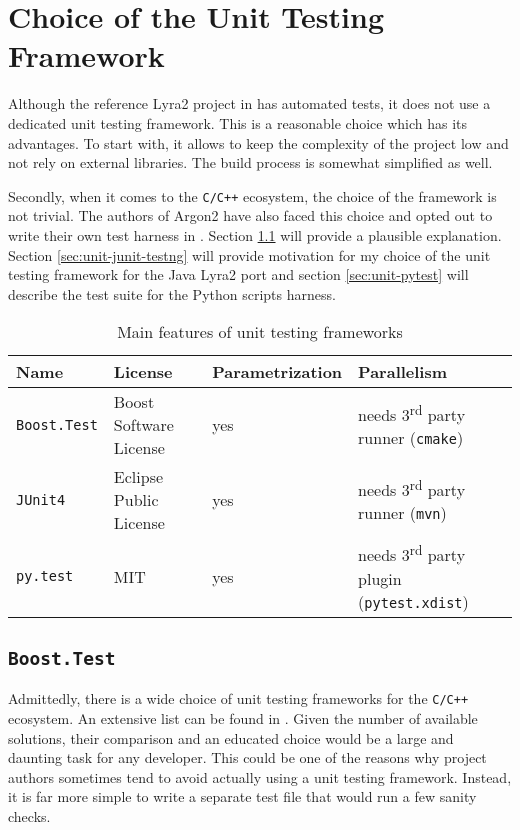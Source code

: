 \section{Choice of the Unit Testing Framework}

Although the reference Lyra2 project in \cite{github:2017:lyra} has automated tests, it does not use a dedicated unit testing framework. This is a reasonable choice which has its advantages. To start with, it allows to keep the complexity of the project low and not rely on external libraries. The build process is somewhat simplified as well.

Secondly, when it comes to the \texttt{C/C++} ecosystem, the choice of the framework is not trivial. The authors of Argon2 have also faced this choice and opted out to write their own test harness in \cite{github:2017:argon2-test.c}. Section \ref{sec:unit-boost-google} will provide a plausible explanation. Section \ref{sec:unit-junit-testng} will provide motivation for my choice of the unit testing framework for the Java Lyra2 port and section \ref{sec:unit-pytest} will describe the test suite for the Python scripts harness.

\begin{table}
\begin{tabular}{llll}
    Name & License & Parametrization & Parallelism \\ \hline
\texttt{Boost.Test} & Boost Software License & yes & needs 3\textsuperscript{rd} party runner (\texttt{cmake}) \\
\texttt{JUnit4} & Eclipse Public License & yes & needs 3\textsuperscript{rd} party runner (\texttt{mvn}) \\
\texttt{py.test} & MIT & yes & needs 3\textsuperscript{rd} party plugin (\texttt{pytest.xdist})
\end{tabular}
\caption{Main features of unit testing frameworks}
\label{table:framework-features-cpp}
\end{table}

\subsection{\texttt{Boost.Test}}
\label{sec:unit-boost-google}

Admittedly, there is a wide choice of unit testing frameworks for the \texttt{C/C++} ecosystem. An extensive list can be found in \cite{wiki:2017:frameworks-c, wiki:2017:frameworks-cpp}. Given the number of available solutions, their comparison and an educated choice would be a large and daunting task for any developer. This could be one of the reasons why project authors sometimes tend to avoid actually using a unit testing framework. Instead, it is far more simple to write a separate test file that would run a few sanity checks.

